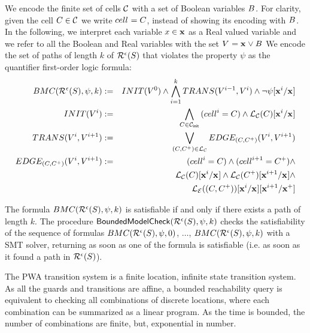 We encode the finite set of cells $\mathcal{C}$ with a set of Boolean
variables ${B}^{}$. For clarity, given the cell $C \in \mathcal{C}$ we
write ${cell}^{} = C$, instead of showing its encoding with ${B}^{}$.
%
In the following, we interpret each variable $x \in \mathbf{x}$ as a Real
valued variable and we refer to all the Boolean and Real variables
with the set ${V}^{} = {\mathbf{x}}^{} \vee {B}^{}$
%
We encode the set of paths of length $k$ of
$\mathcal{R}^{\epsilon}(S)$ that violates the property $\psi$
as the quantifier first-order logic formula:
\begin{eqnarray*}
BMC(\mathcal{R}^{\epsilon}(S), \psi, k) & := &
INIT({V}^{0}) \wedge
\bigwedge_{i=1}^{k}{TRANS({V}^{i-1}, {V}^{i})} \wedge
\neg {\psi}[{{\mathbf{x}}^{i}}/{{\mathbf{x}}^{}}]\\
INIT({V}^{i}) & := &
\bigwedge_{C \in \mathcal{C}_{\mathsf{init}}}{({cell}^{i} = C) \wedge
{\ensuremath \mathcal{L}_\ensuremath \mathcal{C}(C)}[{{\mathbf{x}}^{i}}/{{\mathbf{x}}^{}}]
}
\\
TRANS({V}^{i}, {V}^{i+1}) & := &
  \bigvee_{(C,C^+) \in \mathcal{L}_\mathcal{C}}{
    EDGE_{(C,C^+)}({V}^{i}, {V}^{i+1})
  } \\
EDGE_{(C,C^+)}({V}^{i}, {V}^{i+1}) & := &
({cell}^{i} = C) \wedge ({cell}^{i+1} = C^+) \wedge  \\
&& {\mathcal{L}_\mathcal{C}(C)}[{{\mathbf{x}}^{i}}/{{\mathbf{x}}^{}}] \wedge
   {\ensuremath \mathcal{L}_\ensuremath \mathcal{C}(C^+)}[{{\mathbf{x}}^{i+1}}/{{\mathbf{x}}^{}}] \wedge \\
&& {{\mathcal{L}_\mathcal{E}((C,C^+))}[{{\mathbf{x}}^{i}}/{{\mathbf{x}}^{}}]}[{{\mathbf{x}}^{i+1}}/{{{\mathbf{x}}^{+}}}] \\
\end{eqnarray*}

The formula
$BMC(\mathcal{R}^{\epsilon}(S), \psi, k)$ is satisfiable
if and only if there exists a path of length $k$.
The procedure
$\mathsf{BoundedModelCheck}(\mathcal{R}^{\epsilon}(S), \psi, k)$
checks the satisfiability of the sequence of formulas 
$BMC(\mathcal{R}^{\epsilon}(S), \psi, 0)$, 
$\ldots$,
$BMC(\mathcal{R}^{\epsilon}(S), \psi, k)$
with a SMT solver, returning as soon as one of the formula is
satisfiable (i.e. as soon as it found a path in
$\mathcal{R}^{\epsilon}(S)$).









The PWA transition system is a finite location, infinite state
transition system. As all the guards and transitions are affine, a
bounded reachability query is equivalent to checking all
combinations of discrete locations, where each combination can be
summarized as a linear program. As the time is bounded, the number of
combinations are finite, but, exponential in number.

